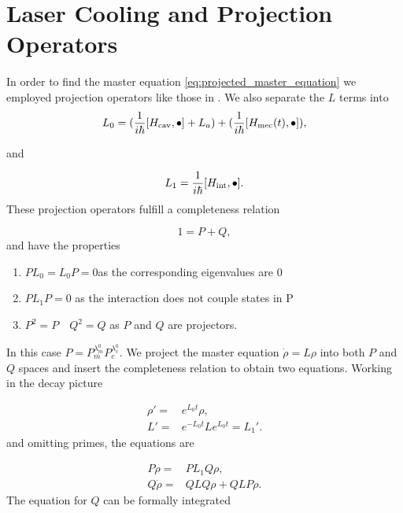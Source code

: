 \documentclass[reprint, amsmath,amssymb, aps,pra]{revtex4-1}
\begin{document}
\appendix

\section{Laser Cooling and Projection Operators}\label{CoolingAppendix}

In order to find the master equation
\eqref{eq:projected_master_equation} we employed projection operators
like those in \cite{CarmichaelQO}. We also separate the $L$ terms into
\begin{equation}
L_0= (\frac{1}{i\hbar}[H_{\rm cav},\bullet]+L_a) +(\frac{1}{i\hbar}[H_{\rm mec}(t),\bullet]),
\end{equation}

and

\begin{equation}
L_1 = \frac{1}{i\hbar}[H_{\rm int},\bullet].
\end{equation}These projection operators fulfill a completeness
relation

\begin{equation}
1 = P + Q,
\end{equation} and have the properties

\begin{enumerate}

\item $ PL_{0} = L_{0}P = 0 $\qquad as the corresponding eigenvalues are 0

\item $PL_{1}P=0$ \qquad as the interaction does not couple states in P

\item $P^2 = P \quad Q^2 = Q$ \qquad as $P$ and $Q$ are projectors.
\end{enumerate} In this case $P=P_m^{\lambda_m^0}P_c^{\lambda_c^0}$. We project the master equation $\dot{\rho}=L\rho$ into both $P$ and $Q$ spaces and insert the completeness relation to obtain two equations. Working in the decay picture

\begin{align*}
 \rho' =& e^{L_0t}\rho,\\
 L' =& e^{-L_0t}Le^{L_0t} = L_1'.
\end{align*} and omitting primes, the equations are

\begin{align*}
P\dot{\rho} =& PL_1Q\rho, \\
Q\dot{\rho} =& QLQ\rho + QLP\rho.
\end{align*} The equation for $Q$ can be formally integrated \cite{TesisMaestria}
\end{document}
